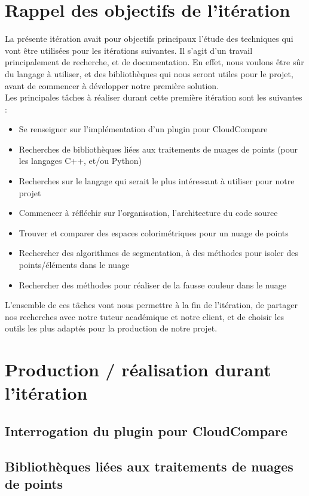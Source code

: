\documentclass[12pt,titlepage,french]{article}
\begin{document}
\section{Rappel des objectifs de l'itération}
La présente itération avait pour objectifs principaux l'étude des techniques qui vont être utilisées pour les itérations suivantes.
Il s'agit d'un travail principalement de recherche, et de documentation. En effet, nous voulons être sûr du langage à utiliser, et des bibliothèques qui nous seront utiles pour le projet, avant de commencer à développer notre première solution.\\
Les principales tâches à réaliser durant cette première itération sont les suivantes :
\begin{itemize}
  \item Se renseigner sur l'implémentation d'un plugin pour CloudCompare
  \item Recherches de bibliothèques liées aux traitements de nuages de points (pour les langages C++, et/ou Python)
  \item Recherches sur le langage qui serait le plus intéressant à utiliser pour notre projet
  \item Commencer à réfléchir sur l'organisation, l'architecture du code source
  \item Trouver et comparer des espaces colorimétriques pour un nuage de points
  \item Rechercher des algorithmes de segmentation, à des méthodes pour isoler des points/éléments dans le nuage
  \item Rechercher des méthodes pour réaliser de la fausse couleur dans le nuage
\end{itemize}

L'ensemble de ces tâches vont nous permettre à la fin de l'itération, de partager nos recherches avec notre tuteur académique et notre client, et de choisir les outils les plus adaptés pour la production de notre projet.

\section{Production / réalisation durant l'itération}

\subsection{Interrogation du plugin pour CloudCompare}


\subsection{Bibliothèques liées aux traitements de nuages de points}
\end{document}
